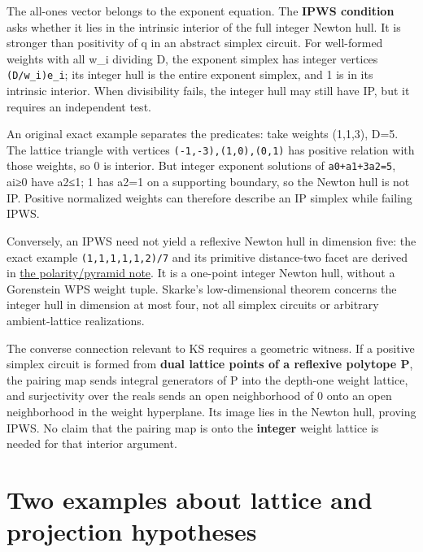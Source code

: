 \documentclass[11pt,a4paper,oneside]{report}
\begin{document}
The all-ones vector belongs to the exponent equation. The \textbf{IPWS
condition} asks whether it lies in the intrinsic interior of the full
integer Newton hull. It is stronger than positivity of q in an abstract
simplex circuit. For well-formed weights with all w\_i dividing D, the
exponent simplex has integer vertices
\texttt{(\allowbreak{}D/\allowbreak{}w\_\allowbreak{}i)\allowbreak{}e\_\allowbreak{}i};
its integer hull is the entire exponent simplex, and 1 is in its
intrinsic interior. When divisibility fails, the integer hull may still
have IP, but it requires an independent test.

An original exact example separates the predicates: take weights
(1,1,3), D=5. The lattice triangle with vertices
\texttt{(\allowbreak{}-\allowbreak{}1,\allowbreak{}-\allowbreak{}3)\allowbreak{},\allowbreak{}(\allowbreak{}1,\allowbreak{}0)\allowbreak{},\allowbreak{}(\allowbreak{}0,\allowbreak{}1)}
has positive relation with those weights, so 0 is interior. But integer
exponent solutions of \texttt{a0+a1+3a2=\allowbreak{}5}, ai≥0 have a2≤1;
1 has a2=1 on a supporting boundary, so the Newton hull is not IP.
Positive normalized weights can therefore describe an IP simplex while
failing IPWS.

Conversely, an IPWS need not yield a reflexive Newton hull in dimension
five: the exact example
\texttt{(\allowbreak{}1,\allowbreak{}1,\allowbreak{}1,\allowbreak{}1,\allowbreak{}1,\allowbreak{}2)\allowbreak{}/\allowbreak{}7}
and its primitive distance-two facet are derived in
\hyperref[ip-reflexivity-and-pyramids--an-actual-nonreflexive-ip-weight-system-an-independent-derivation]{the
polarity\allowbreak{}/\allowbreak{}pyramid note}. It is a one-point
integer Newton hull, without a Gorenstein WPS weight tuple. Skarke's
low-dimensional theorem concerns the integer hull in dimension at most
four, not all simplex circuits or arbitrary ambient-lattice
realizations.

The converse connection relevant to KS requires a geometric witness. If
a positive simplex circuit is formed from \textbf{dual lattice points of
a reflexive polytope P}, the pairing map sends integral generators of P
into the depth-one weight lattice, and surjectivity over the reals sends
an open neighborhood of 0 onto an open neighborhood in the weight
hyperplane. Its image lies in the Newton hull, proving IPWS. No claim
that the pairing map is onto the \textbf{integer} weight lattice is
needed for that interior argument.

\section{Two examples about lattice and projection
hypotheses}\label{weight-systems-and-wps--two-examples-about-lattice-and-projection-hypotheses}
\end{document}
